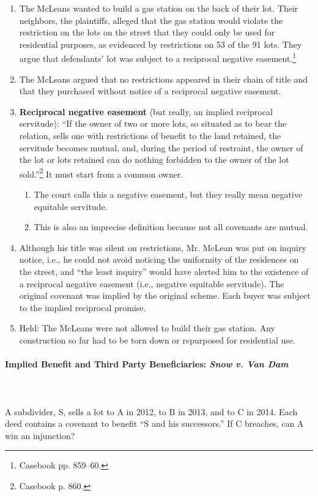 \begin{enumerate}
    \item The McLeans wanted to build a gas station on the back of their lot. 
    Their neighbors, the plaintiffs, alleged that the gas station would 
    violate the restriction on the lots on the street that they could only be 
    used for residential purposes, as evidenced by restrictions on 53 of the 
    91 lots. They argue that defendants' lot was subject to a reciprocal 
    negative easement.\footnote{Casebook pp. 859--60.}
    \item The McLeans argued that no restrictions appeared in their chain of 
    title and that they purchased without notice of a reciprocal negative 
    easement.
    \item \textbf{Reciprocal negative easement} (but really, an implied 
    reciprocal servitude): ``If the owner of two or more lots, so situated as 
    to bear the relation, sells one with restrictions of benefit to the land 
    retained, the servitude becomes mutual, and, during the period of 
    restraint, the owner of the lot or lots retained can do nothing forbidden 
    to the owner of the lot sold.''\footnote{Casebook p.  860.} It must start 
    from a common owner.
    \begin{enumerate}
        \item The court calls this a negative easement, but they really mean 
        negative equitable servitude.
        \item This is also an imprecise definition because not all covenants 
        are mutual.
    \end{enumerate}
    \item Although his title was silent on restrictions, Mr. McLean was put on 
    inquiry notice, i.e., he could not avoid noticing the uniformity of the 
    residences on the street, and ``the least inquiry'' would have alerted him 
    to the existence of a reciprocal negative easement (i.e., negative 
    equitable servitude). The original covenant was implied by the original 
    scheme. Each buyer was subject to the implied reciprocal promise.
    \item Held: The McLeans were not allowed to build their gas station. Any 
    construction so far had to be torn down or repurposed for residential use.
\end{enumerate}

\paragraph{Implied Benefit and Third Party Beneficiaries: \emph{Snow v. Van 
Dam}}
~\\\\
A subdivider, S, sells a lot to A in 2012, to B in 2013, and to C in 2014. Each 
deed contains a covenant to benefit ``S and his successors.'' If C breaches, 
can A win an injunction?

